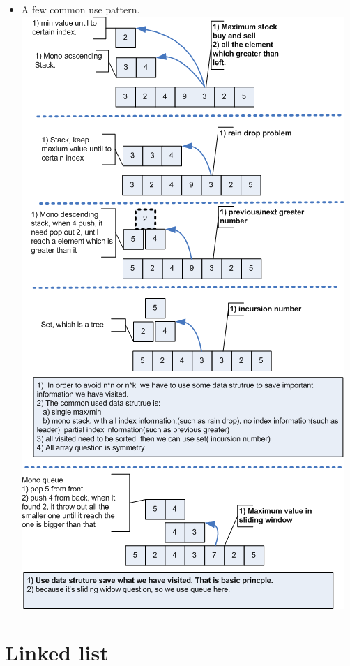 \documentclass[a4paper,11pt,twoside]{book}
\begin{document}
\begin{itemize}
	\item A few common use pattern.  \newline
	\includegraphics[scale=0.65]{pics/array.png} \newline
	
\end{itemize}




\section{Linked list}
\end{document}
